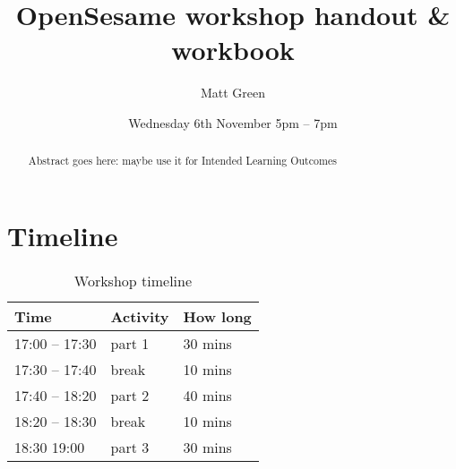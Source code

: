 \documentclass[a4paper]{tufte-handout}
\title{OpenSesame workshop handout \& workbook}
\date{ Wednesday 6th November 5pm -- 7pm} %
\author{Matt Green}
\begin{document}


\maketitle%

\begin{abstract}
\noindent
Abstract goes here: maybe use it for Intended Learning Outcomes
\end{abstract}

\tableofcontents

\section{Timeline}
\label{sec:timeline}

\begin{table}[ht]
  \centering
  \selectfont
  \begin{tabular}{lll}
    \toprule
    Time & Activity & How long \\
    \midrule
    17:00 -- 17:30 & part 1 & 30 mins \\
    17:30 -- 17:40 & break  & 10 mins \\
    17:40 -- 18:20 & part 2 & 40 mins \\
    18:20 -- 18:30 & break  & 10 mins \\
    18:30    19:00 & part 3 & 30 mins \\
    \bottomrule
  \end{tabular}
  \caption{Workshop timeline}
  \label{tab:timeline}
\end{table}
\end{document}
